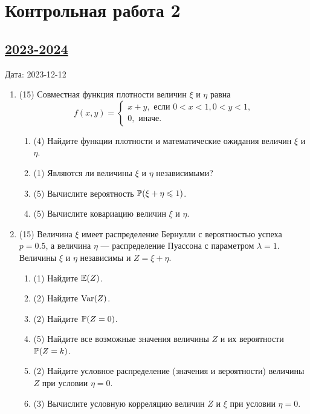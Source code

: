 \newpage
\thispagestyle{empty}
\section{Контрольная работа 2}

\subsection[2023-2024]{\hyperref[sec:sol_kr_02_2023_2024]{2023-2024}}
\label{sec:kr_02_2023_2024}

Дата: 2023-12-12

\begin{enumerate}
  \item  (15) Совместная функция плотности величин $\xi$ и $\eta$ равна 
  \[
  f(x, y)= \begin{cases}
    x+y, \text{ если } 0 < x < 1, 0 < y <1, \\
    0, \text{ иначе.}
  \end{cases}
  \]
  \begin{enumerate}
  \item (4) Найдите функции плотности и математические ожидания величин $\xi$ и $\eta$.
  \item (1) Являются ли величины $\xi$ и $\eta$ независимыми?
  \item (5) Вычислите вероятность $\P(\xi+\eta \leq 1)$.
  \item (5) Вычислите ковариацию величин $\xi$ и $\eta$.
  \end{enumerate}
  
  \item (15) Величина $\xi$ имеет распределение Бернулли с вероятностью успеха $p=0.5$, 
  а величина $\eta$ — распределение Пуассона с параметром $\lambda=1$.
  Величины $\xi$ и $\eta$ независимы и $Z = \xi + \eta$.
  \begin{enumerate}
  \item (1) Найдите $\E(Z)$.
  \item (2) Найдите $\Var(Z)$.
  \item (2) Найдите $\P(Z = 0)$.
  \item (5) Найдите все возможные значения величины $Z$ и их вероятности $\P(Z = k)$.
  \item (2) Найдите условное распределение (значения и вероятности) величины $Z$ при условии  $\eta=0$.
  \item (3) Вычислите условную корреляцию величин $Z$ и $\xi$ при условии $\eta=0$.
  \end{enumerate}
  

\end{enumerate}
